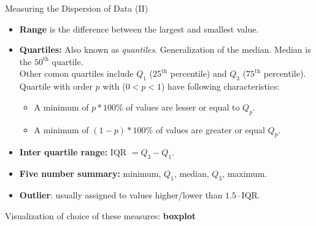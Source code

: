 \begin{frame}{Measuring the Dispersion of Data (II)}
  \begin{itemize}
  \item \textbf{Range} is the difference between the largest and smallest value.
  \item \textbf{Quartiles:} Also known as \textit{quantiles}. Generalization of the median. Median is the $50^{\text{th}}$ quartile.\\
    Other comon quartiles include $Q_1$ ($25^{\text{th}}$ percentile) and $Q_3$
    ($75^{\text{th}}$ percentile).\\\smallskip Quartile with order $p$ with
    ($0 < p < 1$) have following characteristics:
    \begin{itemize}
    \item A minimum of $p * 100\%$ of values are lesser or equal to $Q_p$.
    \item A minimum of $(1 - p) * 100\%$ of values are greater or equal $Q_p$.
    \end{itemize}
  \item \textbf{Inter quartile range:} IQR $=Q_3-Q_1$.
  \item \textbf{Five number summary:} minimum, $Q_1$, median, $Q_3$, maximum.
  \item \textbf{Outlier}: usually assigned to values higher/lower than $1.5 \cdot \text{IQR}$.
  \end{itemize}
  \vspace*{1em}
  Visualization of choice of these measures: \textbf{boxplot}
\end{frame}

